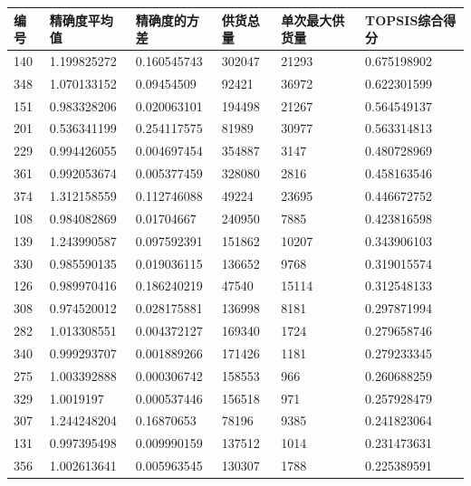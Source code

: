 \documentclass[withoutpreface,bwprint]{cumcmthesis}
\begin{document}
\begin{longtable}{l|llll|l}
    \toprule
    编号 & 精确度平均值 & 精确度的方差 & 供货总量 & 单次最大供货量 & TOPSIS综合得分 \\
    \midrule
    140  & 1.199825272  & 0.160545743  & 302047   & 21293          & 0.675198902    \\
    348  & 1.070133152  & 0.09454509   & 92421    & 36972          & 0.622301599    \\
    151  & 0.983328206  & 0.020063101  & 194498   & 21267          & 0.564549137    \\
    201  & 0.536341199  & 0.254117575  & 81989    & 30977          & 0.563314813    \\
    229  & 0.994426055  & 0.004697454  & 354887   & 3147           & 0.480728969    \\
    361  & 0.992053674  & 0.005377459  & 328080   & 2816           & 0.458163546    \\
    374  & 1.312158559  & 0.112746088  & 49224    & 23695          & 0.446672752    \\
    108  & 0.984082869  & 0.01704667   & 240950   & 7885           & 0.423816598    \\
    139  & 1.243990587  & 0.097592391  & 151862   & 10207          & 0.343906103    \\
    330  & 0.985590135  & 0.019036115  & 136652   & 9768           & 0.319015574    \\
    126  & 0.989970416  & 0.186240219  & 47540    & 15114          & 0.312548133    \\
    308  & 0.974520012  & 0.028175881  & 136998   & 8181           & 0.297871994    \\
    282  & 1.013308551  & 0.004372127  & 169340   & 1724           & 0.279658746    \\
    340  & 0.999293707  & 0.001889266  & 171426   & 1181           & 0.279233345    \\
    275  & 1.003392888  & 0.000306742  & 158553   & 966            & 0.260688259    \\
    329  & 1.0019197    & 0.000537446  & 156518   & 971            & 0.257928479    \\
    307  & 1.244248204  & 0.16870653   & 78196    & 9385           & 0.241823064    \\
    131  & 0.997395498  & 0.009990159  & 137512   & 1014           & 0.231473631    \\
    356  & 1.002613641  & 0.005963545  & 130307   & 1788           & 0.225389591    \\

\end{longtable}
\end{document}
